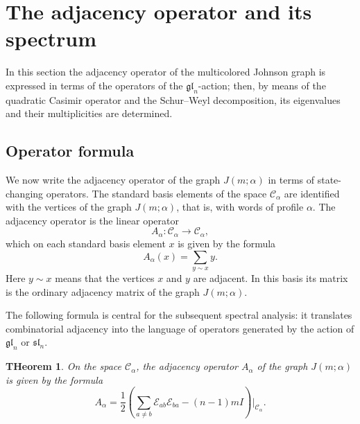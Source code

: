 \documentclass[12pt,reqno]{amsart}
\newtheorem{theorem}{THeorem}[section]
\begin{document}
\section{The adjacency operator and its spectrum}
\label{sec:spectrum}


In this section the adjacency operator of the multicolored Johnson graph
is expressed in terms of the operators of the $\mathfrak{gl}_n$-action;
then, by means of the quadratic Casimir operator and the Schur--Weyl
decomposition, its eigenvalues and their multiplicities are determined.


\subsection{Operator formula}
We now write the adjacency operator of the graph $J(m;\alpha)$ in terms
of state-changing operators.
The standard basis elements of the space $\mathcal C_\alpha$ are
identified with the vertices of the graph $J(m;\alpha)$, that is, with
words of profile $\alpha$. The adjacency operator is the linear operator
$$
A_\alpha:\mathcal C_\alpha\longrightarrow\mathcal C_\alpha,
$$
which on each standard basis element $x$ is given by the formula
$$
A_\alpha(x)
=
\sum_{ y\sim x}y.
$$
Here $y\sim x$ means that the vertices $x$ and $y$ are adjacent.
In this basis its matrix is the ordinary adjacency matrix of the graph
$J(m;\alpha)$.



The following formula is central for the subsequent spectral analysis: it
translates combinatorial adjacency into the language of operators generated
by the action of $\mathfrak{gl}_n$ or $\mathfrak{sl}_n$.

\begin{theorem}
On the space $\mathcal C_\alpha$, the adjacency operator $A_\alpha$ of the
graph $J(m;\alpha)$ is given by the formula
\begin{equation}\label{adjacency_formula}
A_\alpha
=
\frac12
\left(
\sum_{a\ne b}\mathcal E_{ab}\mathcal E_{ba}
-(n-1)mI
\right)\Bigg|_{\mathcal C_\alpha}.
\end{equation}
\end{theorem}
\end{document}
